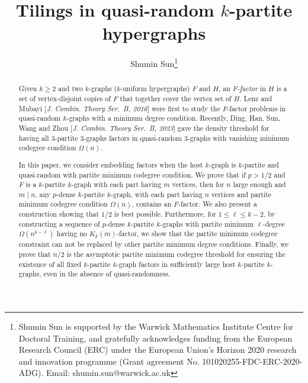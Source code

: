 \documentclass[11pt,a4paper]{article}
\theoremstyle{definition}
\begin{document}

\title{\bf\Large Tilings in quasi-random $k$-partite hypergraphs}

\date{}
\author{Shumin Sun\thanks{Shumin Sun is supported by the Warwick Mathematics Institute Centre for Doctoral Training, and gratefully acknowledges funding from the European Research Council (ERC) under the European Union’s Horizon 2020 research and innovation programme (Grant agreement No. 101020255-FDC-ERC-2020-ADG). Email: shumin.sun@warwick.ac.uk}}
\maketitle
\begin{abstract}
Given $k\ge 2$ and two $k$-graphs ($k$-uniform hypergraphs) $F$ and $H$, an \emph{$F$-factor} in $H$ is a set of vertex-disjoint copies of $F$ that together cover the vertex set of $H$. Lenz and Mubayi 
[\textit{J. Combin. Theory Ser.~B, 2016}]
were first to study the $F$-factor problems in quasi-random $k$-graphs with a minimum degree condition. Recently, Ding, Han, Sun, Wang and Zhou [\textit{J. Combin. Theory Ser.~B, 2023}] gave the density threshold for having all $3$-partite $3$-graphs factors in quasi-random $3$-graphs with vanishing minimum codegree condition $\Omega(n)$. 

In this paper, we consider embedding factors when the host $k$-graph is $k$-partite and quasi-random with partite minimum codegree condition. We prove that if $p>1/2$ and $F$ is a $k$-partite $k$-graph with each part having $m$ vertices, then for $n$ large enough and $m\mid n$, any $p$-dense $k$-partite $k$-graph, with each part having $n$ vertices and partite minimum codegree condition $\Omega(n)$, contains an $F$-factor. We also present a construction showing that $1/2$ is best possible. Furthermore, for $1\leq \ell \leq k-2$, by constructing a sequence of $p$-dense $k$-partite $k$-graphs with partite minimum $\ell$-degree $\Omega(n^{k-\ell})$ having no $K_k(m)$-factor, we show that the partite minimum codegree constraint can not be replaced by other partite  minimum degree conditions. Finally, we prove that $n/2$ is the asymptotic partite minimum codegree threshold for ensuring the existence of  all fixed $k$-partite $k$-graph factors in sufficiently large host $k$-partite $k$-graphs, even in the absence of quasi-randomness.

\end{abstract}
\end{document}
